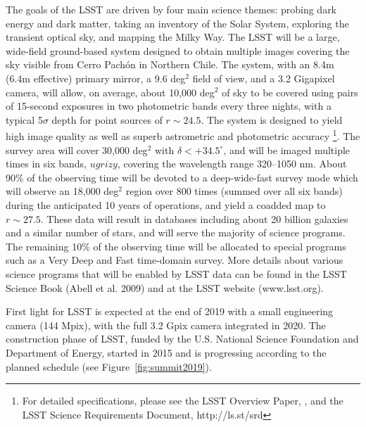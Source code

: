 \documentclass{iau}
\begin{document}
The goals of the LSST are driven by four main science themes: probing dark energy and dark matter, 
taking an inventory of the Solar System, exploring the transient optical sky, and mapping the 
Milky Way. The LSST will be a large, wide-field ground-based system designed to obtain multiple 
images covering the sky visible from Cerro Pach\'{o}n in Northern Chile. 
The system, with an 8.4m (6.4m effective) primary mirror, a 9.6 deg$^2$ field 
of view, and a 3.2 Gigapixel camera, will allow, on average, about 10,000 deg$^2$ of sky to be covered 
using pairs of 15-second exposures in two photometric bands every three nights, 
with a typical 5$\sigma$ depth for point sources of $r\sim24.5$. The system is designed to 
yield high image quality as well as superb astrometric and photometric accuracy \footnote{For 
detailed specifications, please see the LSST Overview Paper,
\cite{Ivezic08LSST}, and the LSST Science Requirements Document, http://ls.st/srd}. 
The survey area will cover 30,000 deg$^2$ with $\delta<+34.5^\circ$, and will be imaged multiple times in six bands, $ugrizy$, covering the wavelength range 320--1050 nm. About 90\% of the 
observing time will be devoted to a deep-wide-fast survey mode which will observe an
18,000 deg$^2$ region over 800 times (summed over all six bands) during the anticipated 
10 years of operations, and yield a coadded map to $r\sim27.5$. These data will result in 
databases including about 20 billion galaxies and a similar number of stars, and will 
serve the majority of science programs. The remaining 10\% of the observing time 
will be allocated to special programs such as a Very Deep and Fast time-domain 
survey. More details about various science programs that will be enabled by LSST data
can be found in the LSST Science Book (Abell et al. 2009) and at the LSST website (www.lsst.org). 

First light for LSST is expected at the end of  2019 with a small engineering camera (144 Mpix), with 
the full 3.2 Gpix camera integrated in 2020. The construction phase of LSST, funded by the U.S. 
National Science Foundation and Department of Energy, started in 2015 and is progressing
according to the planned schedule (see Figure~\ref{fig:summit2019}). 
\end{document}
